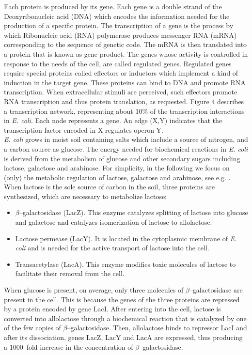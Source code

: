 \documentclass{amsart}
\theoremstyle{definition}
\theoremstyle{remark}
\numberwithin{equation}{section}
\begin{document}
Each protein is produced by its gene. Each gene is a double strand of the Deoxyribonucleic acid (DNA) which encodes the information needed for the production of a specific protein. The transcription of a gene is the process by which  Ribonucleic acid (RNA) polymerase produces messenger RNA (mRNA) corresponding to the sequence of genetic code. The mRNA is then translated into a protein that is known as gene product. 
The genes whose activity is controlled in response to the needs of the cell, are called regulated genes. Regulated genes require special proteins called effectors or inductors which implement a kind of induction in the target gene. These proteins can bind to DNA and promote RNA transcription. 
When extracellular stimuli are perceived, such effectors promote RNA transcription and thus protein translation, as requested. 
Figure 4 describes a transcription network, representing about 10\% of the transcription interactions in \textit{E. coli}. Each node represents a gene. An edge (X,Y) indicates that the transcription factor encoded in X regulates operon Y. \\
\textit{E. coli} grows in moist soil containing salts which include a source of nitrogen, and a carbon source as glucose. 
The energy needed for biochemical reactions in \textit{E. coli} is derived from the metabolism of glucose and other secondary sugars including lactose, galactose and arabinose. For simplicity, in the following we focus on (only) the metabolic regulation of lactose, galactose and arabinose, see e.g. 
\cite{BiocBook1,BiocBook,Alon}. When lactose is the sole source of carbon in the soil, three proteins are synthesized, which are necessary to metabolize lactose: 
\begin{itemize}
\item $\beta$--galactosidase (LacZ). This enzyme catalyzes splitting of lactose into glucose and galactose and catalyzes isomerization of lactose to allolactose.
\item	Lactose permease (LacY). It is located in the cytoplasmic membrane of \textit{E. coli} and is needed for the active transport of lactose into the cell.
\item Transacetylase (LacA). This enzyme modifies toxic molecules of lactose to facilitate their removal from the cell. 
\end{itemize}
When glucose is present, on average, only three molecules of $\beta$--galactosidase are present in the cell. This is because the genes of the three proteins are repressed by a protein encoded by gene LacI. After entering into the cell, lactose is converted into allolactose through a biochemical reaction that is catalyzed by one of the few copies of $\beta$--galactosidase. Then, allolactose binds to repressor LacI and after its dissociation, genes  LacZ, LacY and LacA are expressed, thus producing a 1000--fold increase in the concentration of $\beta$--galactosidase. 
\end{document}
